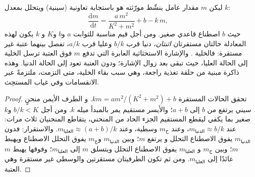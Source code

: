 \begin{theorem}\label{thm:b2:cell-differentiation:switch}
ليكن $m$ مقدار عامل ينشّط مورّثته هو باستجابة
تعاونية (سينية) ويتحلل بمعدل $k$:
\[
\frac{\mathrm{d}m}{\mathrm{d}t} = \frac{a\,m^{2}}{K^{2} + m^{2}} + b - k\,m,
\]
حيث $b$ اصطناع قاعدي صغير. ومن أجل قيم مناسبة للثوابت $a$ و$b$ و$K$ و
$k$ يكون لهذه المعادلة حالتان مستقرتان \emph{اثنتان}، دنيا
قرب $b/k$ وعليا قرب $a/k$، تفصل بينهما عتبة
غير مستقرة: فالخلية \emph{}. والإشارة الاستحثاثية
العابرة التي تدفع $m$ فوق العتبة ترسل الخلية إلى
الحالة العليا، حيث تبقى بعد زوال الإشارة؛ ودون
العتبة تعود إلى الحالة الدنيا. وهذه ذاكرة مبنية من
حلقة تغذية راجعة، وهي سبب بقاء الخلية، متى التزمت،
ملتزمةً عبر الانقسامات وفي غياب المستحِث.
\end{theorem}
\begin{proof}
تحقق الحالات المستقرة $k m = a m^{2}/(K^{2} + m^{2}) + b$. و
الطرف الأيمن منحنٍ سيني يرتفع من $b$ إلى $a + b$؛ والأيسر
مستقيم يمر بالمبدأ ميله $k$. ومن أجل $b/k < K$ و$k$ صغير
بما يكفي ليقطع المستقيم الجزء الحاد من المنحني، يتقاطع
المنحنيان ثلاث مرات: عند $m_{\text{الدنيا}} \approx b/k$، وعند
$m_{\text{ح}}$ وسطية، وعند $m_{\text{العليا}} \approx (a +
b)/k$. والاستقرار: فدون $m_{\text{الدنيا}}$ يفوق الاصطناع التحلل و
يرتفع $m$؛ وبين $m_{\text{الدنيا}}$ و$m_{\text{ح}}$ يفوق التحلل
الاصطناع ويهبط $m$؛ وبين $m_{\text{ح}}$ و
$m_{\text{العليا}}$ يفوق الاصطناع التحلل ويتسلق $m$ إلى
$m_{\text{العليا}}$؛ وفوقها يهبط $m$ عائدًا إلى $m_{\text{العليا}}$.
ومن ثم تكون الطرفيتان مستقرتين والوسطى غير مستقرة وهي
العتبة.
\end{proof}

